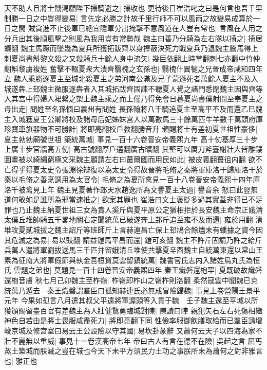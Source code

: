 天不助人且將士饑渇願陛下攝騎避之|{
	攝收也}
更待後日崔浩叱之曰是何言也吾千里制勝一日之中豈得變易|{
	言先定必勝之計故千里行師不可以風雨之故變易成算於一日之間}
賊貪進不止後軍已絶宜隱軍分出掩撃不意風道在人豈有常也|{
	言風在人用之分兵出其後順風擊之則風為我用豈有常勢哉}
魏主曰善乃分騎為左右隊以掎之|{
	掎居蟻翻}
魏主馬蹶而墜幾為夏兵所獲拓跋齊以身捍蔽決死力戰夏兵乃退魏主騰馬得上刺夏尚書斛黎文殺之又殺騎兵十餘人身中流矢|{
	幾巨依翻上時掌翻刺七亦翻中竹仲翻斛黎虜複姓}
奮擊不輟夏衆大潰齊翳槐之玄孫也|{
	翳槐什翼犍之兄晉成帝咸和四年立}
魏人乘勝逐夏主至城北殺夏主之弟河南公滿及兄子蒙遜死者萬餘人夏主不及入城遂犇上邽魏主微服逐犇者入其城拓跋齊固諫不聽夏人覺之諸門悉閉魏主因與齊等入其宫中得婦人裙繋之槊上魏主乘之而上僅乃得免會日暮夏尚書僕射問至奉夏主之母出走|{
	問姓至名孫愐曰襄州有問姓}
長孫翰將八千騎追夏主至高平不及而還乙巳魏主入城獲夏王公卿將校及諸母后妃姊妹宫人以萬數馬三十餘萬匹牛羊數千萬頭府庫珍寶車旗器物不可勝計|{
	將即亮翻校戶教翻勝音升}
頒賜將士有差初夏世祖性豪侈|{
	夏主勃勃廟號世祖}
築統萬城|{
	事見一百十六卷晉安帝義熙九年}
高十仞基厚三十步上廣十步官牆高五仞|{
	高古號翻厚戶遘翻廣古曠翻}
其堅可以厲刀斧臺榭壯大皆雕鏤圖畫被以綺繡窮極文采魏主顧謂左右曰蕞爾國而用民如此|{
	被皮義翻蕞徂内翻}
欲不亡得乎得夏太史令張淵徐辯復以為太史令得故晉將毛脩之秦將軍庫洛干歸庫洛干於秦以毛脩之善烹調用為太官令|{
	毛脩之為夏所禽見一百十八卷晉安帝義熙十四年庫洛千被禽見上年}
魏主見夏著作郎天水趙逸所為文譽夏主太過|{
	譽音余}
怒曰此竪無道何敢如是誰所為邪當速推之|{
	欲案其罪也}
崔浩曰文士褒貶多過其實蓋非得已不足罪也乃止魏主納夏世祖三女為貴人奚斤與夏平原公定猶相拒於長安魏主命宗正娥清太僕丘堆帥騎五千畧地關右定聞統萬已破遂奔上邽斤追至雍不及而還|{
	雍於用翻}
清堆攻夏貳城拔之魏主詔斤等班師斤上言赫連昌亡保上邽鳩合餘燼未有蟠據之資今因其危滅之為易|{
	易以豉翻}
請益鎧馬平昌而還|{
	鎧可亥翻}
魏主不許斤固請乃許之給斤兵萬人遣將軍劉拔送馬三千匹并留娥清丘堆使共擊夏辛酉魏主自統萬東還以常山王素為征南大將軍假節與執金吾桓貸莫雲留鎮統萬|{
	魏書官氏志内入諸姓烏丸氏為恒氏}
雲題之弟也|{
	莫題見一百十四卷晉安帝義熙四年}
秦王熾磐還枹罕|{
	夏既破故熾磐還枹音膚}
秋七月己卯魏主至柞嶺|{
	柞嶺即柞山之嶺柞則洛翻}
柔然寇雲中聞魏已克統萬乃遁去　秦王熾磐謂羣臣曰孤知赫連氏必無成冒險歸魏|{
	事見上卷營陽王景平元年}
今果如孤言八月遣其叔父平遠將軍渥頭等入貢于魏　壬子魏主還至平城以所獲頒賜留臺百官有差魏主為人壯健鷙勇臨城對陳|{
	陳讀曰陣}
親犯矢石左右死傷相繼神色自若由是將士畏服咸盡死力|{
	將即亮翻下同}
性儉率服御飲膳取給而已羣臣請增峻京城及修宫室曰易云王公設險以守其國|{
	易坎卦彖辭}
又蕭何云天子以四海為家不壯不麗無以重威|{
	事見十一卷漢高帝七年}
帝曰古人有言在德不在險|{
	吳起之言}
屈丐蒸土築城而朕滅之豈在城也今天下未平方須民力土功之事朕所未為蕭何之對非雅言也|{
	雅正也}

